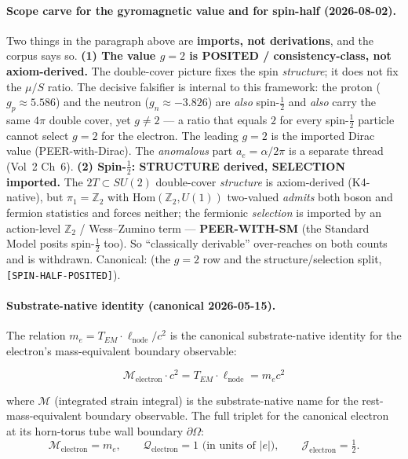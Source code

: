 \paragraph{Scope carve for the gyromagnetic value and for spin-half (2026-08-02).}
Two things in the paragraph above are \textbf{imports, not derivations}, and the corpus says so.
\textbf{(1) The value $g = 2$ is POSITED / consistency-class, not axiom-derived.} The double-cover
picture fixes the spin \emph{structure}; it does not fix the $\mu/S$ ratio. The decisive falsifier is
internal to this framework: the proton ($g_p \approx 5.586$) and the neutron ($g_n \approx -3.826$)
are \emph{also} spin-$\tfrac{1}{2}$ and \emph{also} carry the same $4\pi$ double cover, yet
$g \neq 2$ --- a ratio that equals $2$ for every spin-$\tfrac{1}{2}$ particle cannot select $g = 2$
for the electron. The leading $g = 2$ is the imported Dirac value (PEER-with-Dirac). The
\emph{anomalous} part $a_e = \alpha/2\pi$ is a separate thread (Vol~2 Ch~6).
\textbf{(2) Spin-$\tfrac{1}{2}$: STRUCTURE derived, SELECTION imported.} The $2T \subset SU(2)$
double-cover \emph{structure} is axiom-derived (K4-native), but $\pi_1 = \mathbb{Z}_2$ with
$\mathrm{Hom}(\mathbb{Z}_2, U(1))$ two-valued \emph{admits} both boson and fermion statistics and
forces neither; the fermionic \emph{selection} is imported by an action-level $\mathbb{Z}_2$ /
Wess--Zumino term --- \textbf{PEER-WITH-SM} (the Standard Model posits spin-$\tfrac{1}{2}$ too).
So ``classically derivable'' over-reaches on both counts and is withdrawn. Canonical:
 (the $g=2$
row and the structure/selection split, \texttt{[SPIN-HALF-POSITED]}).

\paragraph{Substrate-native identity (canonical 2026-05-15).}
The relation $m_e = T_{EM} \cdot \ell_{\text{node}}/c^2$ is the canonical
substrate-native identity for the electron's mass-equivalent boundary observable:

\begin{equation}
\mathcal{M}_{\text{electron}} \cdot c^2 = T_{EM} \cdot \ell_{\text{node}} = m_e c^2
\label{eq:M_electron_identity}
\end{equation}

where $\mathcal{M}$ (integrated strain integral) is the substrate-native name for
the rest-mass-equivalent boundary observable. The full triplet for the canonical
electron at its horn-torus tube wall boundary $\partial\Omega$:
\[
\mathcal{M}_{\text{electron}} = m_e, \qquad
\mathcal{Q}_{\text{electron}} = 1 \text{ (in units of } |e|\text{)},
\qquad \mathcal{J}_{\text{electron}} = \tfrac{1}{2}.
\]


